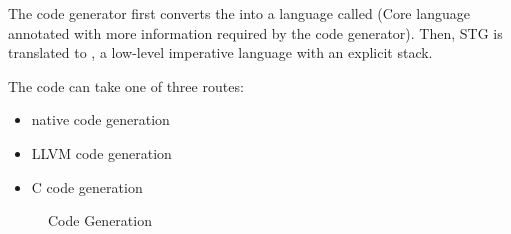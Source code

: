 The code generator first converts the  into a language called  (Core language annotated with more information required by the code generator). Then, STG is translated to , a low-level imperative language with an explicit stack. 

The code can take one of three routes:
\begin{itemize}
    \item native code generation
    \item LLVM code generation
    \item C code generation
\end{itemize}

\begin{figure*}
    \centering
    
    \caption{Code Generation}
    \label{fig::code::generation}
\end{figure*}
